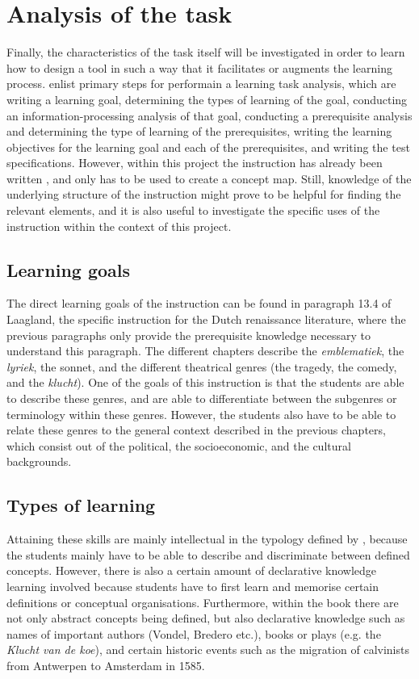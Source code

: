 \section{Analysis of the task}

Finally, the characteristics of the task itself will be investigated in order to learn how to design a tool in such a way that it facilitates or augments the learning process.  enlist primary steps for performain a learning task analysis, which are writing a learning goal, determining the types of learning of the goal, conducting an information-processing analysis of that goal, conducting a prerequisite analysis and determining the type of learning of the prerequisites, writing the learning objectives for the learning goal and each of the prerequisites, and writing the test specifications. However, within this project the instruction has already been written \cite{laagland}, and only has to be used to create a concept map. Still, knowledge of the underlying structure of the instruction might prove to be helpful for finding the relevant elements, and it is also useful to investigate the specific uses of the instruction within the context of this project.

\subsection{Learning goals}

The direct learning goals of the instruction can be found in paragraph 13.4 of Laagland, the specific instruction for the Dutch renaissance literature, where the previous paragraphs only provide the prerequisite knowledge necessary to understand this paragraph. The different chapters describe the \emph{emblematiek}, the \emph{lyriek}, the sonnet, and the different theatrical genres (the tragedy, the comedy, and the \emph{klucht}). One of the goals of this instruction is that the students are able to describe these genres, and are able to differentiate between the subgenres or terminology within these genres. However, the students also have to be able to relate these genres to the general context described in the previous chapters, which consist out of the political, the socioeconomic, and the cultural backgrounds.

\subsection{Types of learning}

Attaining these skills are mainly intellectual in the typology defined by , because the students mainly have to be able to describe and discriminate between defined concepts. However, there is also a certain amount of declarative knowledge learning involved because students have to first learn and memorise certain definitions or conceptual organisations. Furthermore, within the book there are not only abstract concepts being defined, but also declarative knowledge such as names of important authors (Vondel, Bredero etc.), books or plays (e.g. the \emph{Klucht van de koe}), and certain historic events such as the migration of calvinists from Antwerpen to Amsterdam in 1585.

